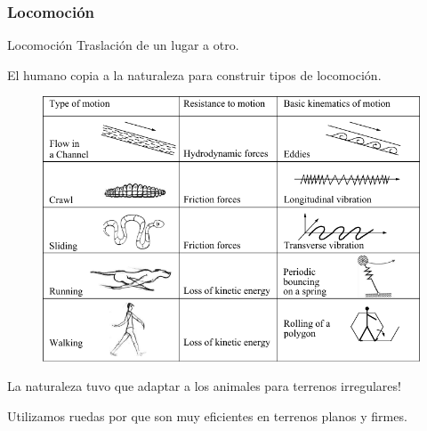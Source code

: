 
\begin{frame}
    \frametitle{Locomoción}
    \footnotesize

    \begin{block}{Locomoción}
        Traslación de un lugar a otro.
    \end{block}

    El humano copia a la naturaleza para construir tipos de locomoción.

    \begin{figure}
        \includegraphics[width=0.4\columnwidth]{images/biological_locomotion_systems.pdf}
    \end{figure}

    La naturaleza tuvo que adaptar a los animales para terrenos irregulares!


    Utilizamos ruedas por que son muy eficientes en terrenos planos y firmes.
\end{frame}


